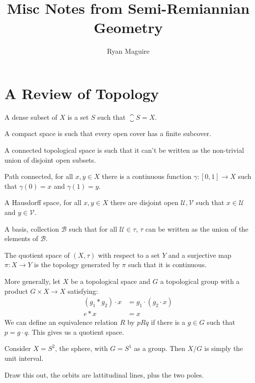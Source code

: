\documentclass{article}                                                        %
\begin{document}
    \title{Misc Notes from Semi-Remiannian Geometry}
    \author{Ryan Maguire}
    \date{\vspace{-5ex}}
    \maketitle
    \tableofcontents
    \listoffigures
    \section{A Review of Topology}
        \begin{definition}
            A dense subset of $X$ is a set $S$ such that
            $\closure{S}=X$.
        \end{definition}
        \begin{definition}
            A compact space is such that every open cover has a finite subcover.
        \end{definition}
        \begin{definition}
            A connected topological space is such that it can't be written as
            the non-trivial union of disjoint open subsets.
        \end{definition}
        \begin{definition}
            Path connected, for all $x,y\in{X}$ there is a continuous function
            $\gamma:[0,1]\rightarrow{X}$ such that $\gamma(0)=x$ and
            $\gamma(1)=y$.
        \end{definition}
        \begin{definition}
            A Hausdorff space, for all $x,y\in{X}$ there are disjoint open
            $\mathcal{U},\mathcal{V}$ such that $x\in\mathcal{U}$ and
            $y\in\mathcal{V}$.
        \end{definition}
        \begin{definition}
            A basis, collection $\mathscr{B}$ such that for all
            $\mathcal{U}\in\tau$, $\tau$ can be written as the union of the
            elements of $\mathscr{B}$.
        \end{definition}
        \begin{definition}
            The quotient space of $(X,\tau)$ with respect to a set $Y$ and
            a surjective map $\pi:X\rightarrow{Y}$ is the topology generated
            by $\pi$ such that it is continuous.
        \end{definition}
        More generally, let $X$ be a topological space and $G$ a topological
        group with a product $G\times{X}\rightarrow{X}$ satisfying:
        \begin{align}
            (g_{1}*{g}_{2})\cdot{x}&=g_{1}\cdot(g_{2}\cdot{x})\\
            e*x&=x
        \end{align}
        We can define an equivalence relation $R$ by $pRq$ if there is a
        $g\in{G}$ such that $p=g\cdot{q}$. This gives us a quotient space.
        \begin{example}
            Consider $X=S^{2}$, the sphere, with $G=S^{1}$ as a group.
            Then $X/G$ is simply the unit interval.
        \end{example}
        Draw this out, the orbits are lattitudinal lines, plus the two
        poles.
\end{document}
